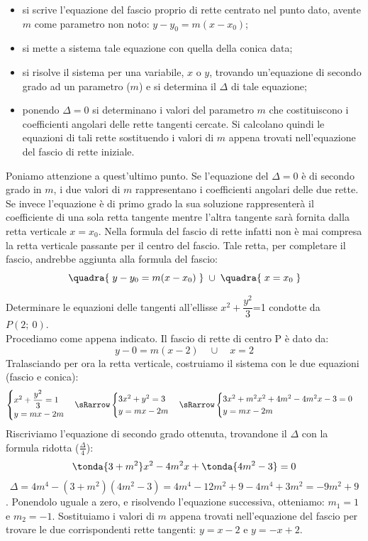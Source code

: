 \begin{itemize} [noitemsep]
  \item si scrive l'equazione del fascio proprio di rette centrato 
nel punto dato, avente \(m\) come parametro non noto: \(y- y_{0} =m\left(x-x_{0}\right)\);
  \item si mette a sistema tale equazione con quella della conica 
data;
  \item si risolve il sistema per una variabile, \(x\) o \(y\), trovando un'equazione
  di secondo grado ad un parametro (\(m\)) e si determina il \( \Delta \) 
di tale equazione;
  \item ponendo \( \Delta =0\) si determinano i valori del parametro \(m\) 
che costituiscono i coefficienti angolari delle rette tangenti cercate. Si calcolano quindi
le equazioni di tali rette sostituendo i valori di \(m\) appena trovati nell'equazione del fascio di 
rette iniziale.
\end{itemize}

  Poniamo attenzione a quest'ultimo punto. Se l'equazione 
del \( \Delta =0\) è di secondo grado in \(m\), i due valori di \(m\) rappresentano i 
coefficienti angolari delle due rette. Se invece l'equazione è di 
primo grado la sua soluzione rappresenterà il coefficiente di una sola retta 
tangente mentre l'altra tangente sarà fornita dalla retta verticale \(x= 
x_{0} \). Nella formula del fascio di rette infatti non è mai compresa la 
retta verticale passante per il centro del fascio. Tale retta, per 
completare il fascio, andrebbe aggiunta alla formula del fascio:
\[\quadra{\;y-y_{0} =m(x- x_{0} )\;}\; \cup\; \quadra{\;x= x_{0}\;} \]
  

\begin{esempio} Determinare le equazioni delle tangenti 
all'ellisse \( x^{2} + \dfrac{y^{2}}{3} \)=1 condotte da \(P(2;~0)\).
\\[7pt]
Procediamo come appena indicato. Il fascio di rette di centro 
P è dato da:
\[y-0=m(x-2)\quad \cup  \quad x=2\] 
Tralasciando per ora la retta verticale,
costruiamo il sistema con le due equazioni (fascio e conica):
\[\begin{cases}  x^{2}+\dfrac{y^{2}}{3}=1   \\ y=mx-2m  
\end{cases} \sRarrow  
\begin{cases}  3x^{2}+y^{2}=3   \\ y=mx-2m  
\end{cases} \sRarrow  
\begin{cases}  3x^{2}+m^{2}x^{2}+4m^{2}-4m^{2}x-3=0   \\ y=mx-2m  
\end{cases}\]
Riscriviamo l'equazione di secondo grado ottenuta, trovandone il \(\Delta\) 
con la formula ridotta (\(\frac{\Delta}{4}\)):
\[\tonda{3+ m^{2} } x^{2} -4 m^{2} x+\tonda{4 m^{2} -3}=0\] 
\[\Delta =4 m^{4} -(3+ m^{2} )(4m^{2}-3)=
4 m^{4} -12 m^{2} +9-4 m^{4} +3 m^{2} =-9 m^{2} +9\]. 
Ponendolo uguale a zero, e risolvendo 
l'equazione successiva, otteniamo: \(m_{1} = 1\) e \(m_{2} = -1\).
Sostituiamo i valori di \(m\) appena trovati nell'equazione del fascio per trovare le 
due corrispondenti rette tangenti: \(y=x-2\) e \(y=-x+2\).
\end{esempio}

